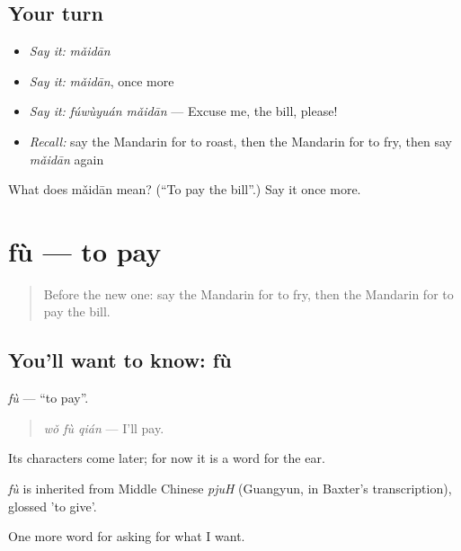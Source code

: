 \subsection*{Your turn}
\begin{itemize}
\raggedright
  \item \emph{Say it:} \emph{mǎidān}
  \item \emph{Say it:} \emph{mǎidān}, once more
  \item \emph{Say it:} \emph{fúwùyuán mǎidān} — Excuse me, the bill, please!
  \item \emph{Recall:} say the Mandarin for to roast, then the Mandarin for to fry, then say \emph{mǎidān} again
\end{itemize}

\begin{tcolorbox}[breakable,colback=teal!4,colframe=teal!35!black,title={Before you move on}]
What does mǎidān mean? (\textquotedblleft{}To pay the bill\textquotedblright{}.) Say it once more.
\end{tcolorbox}
\section[fù]{fù — to pay}

\label{lesson:ZH-C114-fu}



\begin{quote}
Before the new one: say the Mandarin for to fry, then the Mandarin for to pay the bill.
\end{quote}

\subsection*{You'll want to know: fù}
\emph{fù} — \textquotedblleft{}to pay\textquotedblright{}.

\begin{quote}
\emph{wǒ fù qián} — I'll pay.
\end{quote}

Its characters come later; for now it is a word for the ear.

\begin{cousinweb}
\emph{fù} is inherited from Middle Chinese \emph{pjuH} (Guangyun, in Baxter's transcription), glossed 'to give'.
\end{cousinweb}

\begin{grammarlens}[title={What you've built}]
One more word for asking for what I want.
\end{grammarlens}


